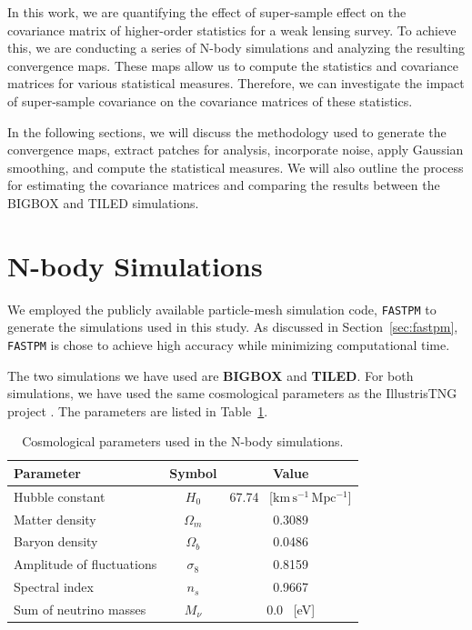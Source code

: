
In this work, we are quantifying the effect of super-sample effect on the covariance matrix of higher-order statistics for a weak lensing survey. To achieve this, we are conducting a series of N-body simulations and analyzing the resulting convergence maps. These maps allow us to compute the statistics and covariance matrices for various statistical measures. Therefore, we can investigate the impact of super-sample covariance on the covariance matrices of these statistics.

In the following sections, we will discuss the methodology used to generate the convergence maps, extract patches for analysis, incorporate noise, apply Gaussian smoothing, and compute the statistical measures. We will also outline the process for estimating the covariance matrices and comparing the results between the BIGBOX and TILED simulations. 

\section{N-body Simulations}
We employed the publicly available particle-mesh simulation code, \texttt{FASTPM} \citep{10.1093/mnras/stw2123} to generate the simulations used in this study. As discussed in Section~\ref{sec:fastpm}, \texttt{FASTPM} is chose to achieve high accuracy while minimizing computational time. 

The two simulations we have used are \textbf{BIGBOX} and \textbf{TILED}. For both simulations, we have used the same cosmological parameters as the IllustrisTNG project \citep{2019ComAC...6....2N}. The parameters are listed in Table~\ref{tab:simulations}. 

\begin{table}[h]
    \centering
    \begin{tabular}{lcc}
    \toprule
    \textbf{Parameter} & \textbf{Symbol} & \textbf{Value} \\
    \midrule
    Hubble constant & $H_0$ & 67.74 \, [$\mathrm{km\,s^{-1}\,Mpc^{-1}}$] \\ 
    Matter density & $\Omega_m$ & 0.3089 \\
    Baryon density & $\Omega_b$ & 0.0486 \\
    Amplitude of fluctuations & $\sigma_8$ & 0.8159 \\
    Spectral index & $n_s$ & 0.9667 \\
    Sum of neutrino masses & $M_{\nu}$ & 0.0 \, [eV] \\
    \bottomrule
    \end{tabular}
    \caption{Cosmological parameters used in the N-body simulations.}\label{tab:simulations}
    \end{table}

